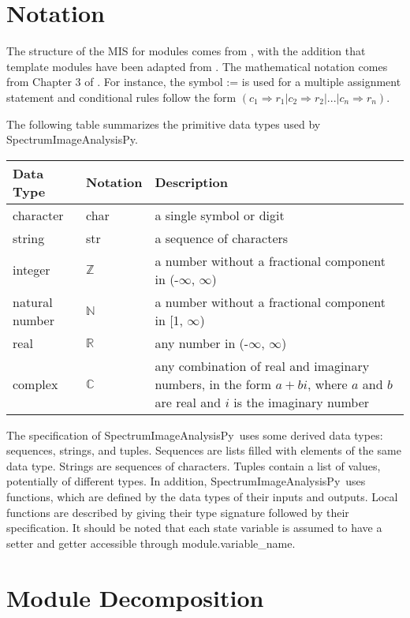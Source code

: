 \documentclass[12pt, titlepage]{article}
\newcommand{\progname}{SpectrumImageAnalysisPy}
\begin{document}
\section{Notation}
The structure of the MIS for modules comes from \cite{HoffmanAndStrooper1995},
with the addition that template modules have been adapted from
\cite{GhezziEtAl2003}.  The mathematical notation comes from Chapter 3 of
\cite{HoffmanAndStrooper1995}.  For instance, the symbol := is used for a
multiple assignment statement and conditional rules follow the form $(c_1
\Rightarrow r_1 | c_2 \Rightarrow r_2 | ... | c_n \Rightarrow r_n )$.

The following table summarizes the primitive data types used by \progname. 

\begin{center}
\renewcommand{\arraystretch}{1.2}
\noindent 
\begin{tabular}{l l p{7.5cm}} 
\toprule 
\textbf{Data Type} & \textbf{Notation} & \textbf{Description}\\ 
\midrule
character & char & a single symbol or digit\\
string & str & a sequence of characters\\
integer & $\mathbb{Z}$ & a number without a fractional component in (-$\infty$, $\infty$) \\
natural number & $\mathbb{N}$ & a number without a fractional component in [1, $\infty$) \\
real & $\mathbb{R}$ & any number in (-$\infty$, $\infty$)\\
complex & $\mathbb{C}$ & any combination of real and imaginary numbers, in the form $a+bi$, where $a$ and $b$ are real and $i$ is the imaginary number\\
\bottomrule
\end{tabular} 
\end{center}

\noindent
The specification of \progname \ uses some derived data types: sequences, strings, and
tuples. Sequences are lists filled with elements of the same data type. Strings
are sequences of characters. Tuples contain a list of values, potentially of
different types. In addition, \progname \ uses functions, which
are defined by the data types of their inputs and outputs. Local functions are
described by giving their type signature followed by their specification. It should be noted that each state variable is assumed to have a setter and getter accessible through module.variable\_name.

\section{Module Decomposition}
\end{document}

